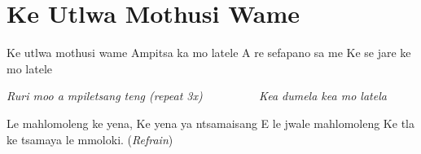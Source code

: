 \starttocol
\chapter{Ke Utlwa Mothusi Wame}
\nexttocol
\hfill{\it }
\stoptocol
\starttocol
\startlines
{\sc Ke} utlwa mothusi wame
Ampitsa ka mo latele
A re sefapano sa me
Ke se jare ke mo latele 

{\it Ruri moo a mpiletsang teng
          \hfill({\it repeat 3x})~~~~~~~~~
Kea dumela kea mo latela}

Le mahlomoleng ke yena,
Ke yena ya ntsamaisang
E le jwale mahlomoleng
Ke tla ke tsamaya le mmoloki.
          \hfill({\it Refrain})~~~~~~~~~
\stoplines
\nexttocol

\stoptocol
